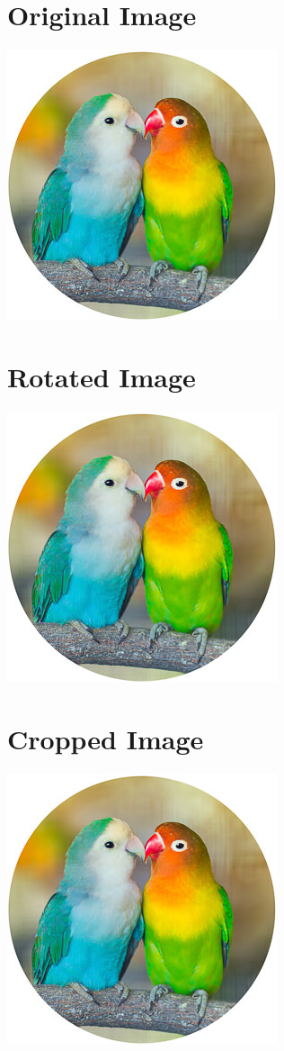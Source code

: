 \documentclass{article}
\begin{document}
    \section{Original Image}
    \includegraphics{parrot.jpeg}

    \section{Rotated Image}
    \includegraphics[angle=180]{parrot.jpeg}

    \section{Cropped Image}
    \includegraphics[clip=true, trim = 5mm 5mm 5mm 5mm]{parrot.jpeg}
\end{document}
